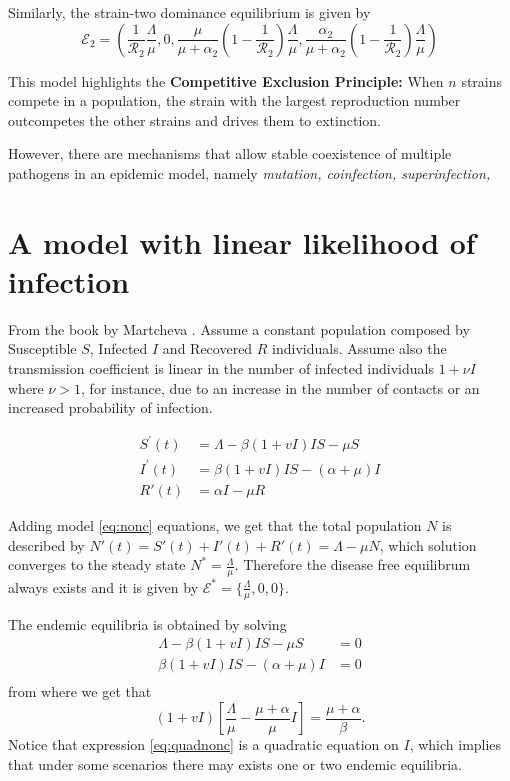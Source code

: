 \documentclass{book}
\begin{document}
Similarly, the strain-two dominance equilibrium is given by
\begin{equation}
\mathscr{E}_{2}=\left(\frac{1}{\mathscr{R}_{2}} \frac{\Lambda}{\mu}, 0, \frac{\mu}{\mu+\alpha_{2}}\left(1-\frac{1}{\mathscr{R}_{2}}\right) \frac{\Lambda}{\mu}, \frac{\alpha_{2}}{\mu+\alpha_{2}}\left(1-\frac{1}{\mathscr{R}_{2}}\right) \frac{\Lambda}{\mu}\right)
\end{equation}

This model highlights the {\bf Competitive Exclusion Principle:} When $n$ strains compete in a population, the strain with the largest reproduction number outcompetes the other strains and drives them to extinction.

However, there are mechanisms that allow stable coexistence of multiple pathogens in an epidemic model, namely {\it mutation, coinfection, superinfection, } 

\section{A model with linear likelihood of infection}

From the book by Martcheva \cite{martcheva2015introduction}. Assume a constant population composed by Susceptible $S$, Infected $I$ and Recovered $R$ individuals. Assume also the transmission coefficient is linear in the number of infected individuals $1+\nu I$ where $\nu>1$, for instance, due to an increase in the number of contacts or an increased probability of infection.

\begin{align} \label{eq:nonc}
\nonumber S^{\prime}(t) &=\Lambda-\beta(1+v I) I S-\mu S\\
I^{\prime}(t) &=\beta(1+v I) I S-(\alpha+\mu) I\\
\nonumber R'(t)&=\alpha I-\mu R
\end{align}

Adding model \eqref{eq:nonc} equations, we get that the total population $N$ is described by $N'(t)=S'(t)+I'(t)+R'(t)=\Lambda-\mu N$, which solution converges to the steady state $N^*=\frac{\Lambda}{\mu}$. Therefore the disease free equilibrum always exists and it is given by $\mathcal{E}^*=\{ \frac{\Lambda}{\mu},0,0 \}$.

The endemic equilibria is obtained by solving 
\begin{align} \label{eq:endnonc}
\Lambda-\beta(1+v I) I S-\mu S&=0\\
\beta(1+v I) I S-(\alpha+\mu) I&=0\\
\end{align}
from where we get that
\begin{equation} \label{eq:quadnonc}
(1+v I)\left[\frac{\Lambda}{\mu}-\frac{\mu+\alpha}{\mu} I\right]=\frac{\mu+\alpha}{\beta}.
\end{equation}
Notice that expression \eqref{eq:quadnonc} is a quadratic equation on $I$, which implies that under some scenarios there may exists one or two endemic equilibria.
\end{document}
